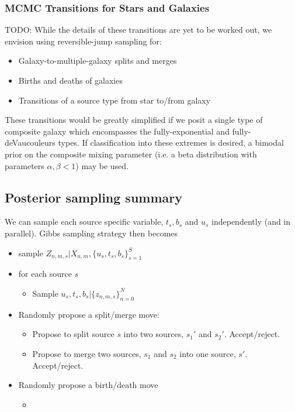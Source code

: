 \documentclass[11pt]{article}
\begin{document}
\subsubsection{MCMC Transitions for Stars and Galaxies}

TODO: While the details of these transitions are yet to be worked
out, we envision using reversible-jump sampling for:
\begin{itemize}
\item Galaxy-to-multiple-galaxy splits and merges
\item Births and deaths of galaxies
\item Transitions of a source type from star to/from galaxy
\end{itemize}
These transitions would be greatly simplified if we posit a single
type of composite galaxy which encompasses the fully-exponential and
fully-deVaucouleurs types. If classification into these extremes is
desired, a bimodal prior on the composite mixing parameter (i.e. a
beta distribution with parameters $\alpha,\beta<1$) may be used.%

\subsection{Posterior sampling summary}

We can sample each source specific variable, $t_s, b_s$ and $u_s$ independently (and in parallel).  Gibbs sampling strategy then becomes
\begin{itemize}
\item sample $Z_{n,m,s} | X_{n,m}, \{u_s, t_s, b_s\}_{s=1}^S$
\item for each source $s$
  \begin{itemize}
  \item Sample $u_s, t_s, b_s | \{z_{n,m,s}\}_{n=0}^N$
  \end{itemize}
\item Randomly propose a split/merge move: 
  \begin{itemize}
  \item Propose to split source $s$ into two sources, $s_1'$ and $s_2'$.  Accept/reject.
  \item Propose to merge two sources, $s_1$ and $s_2$ into one source, $s'$.  Accept/reject. 
  \end{itemize}
  
\item Randomly propose a birth/death move
  \begin{itemize}
  \item  
  \end{itemize}
\end{itemize}
\end{document}
